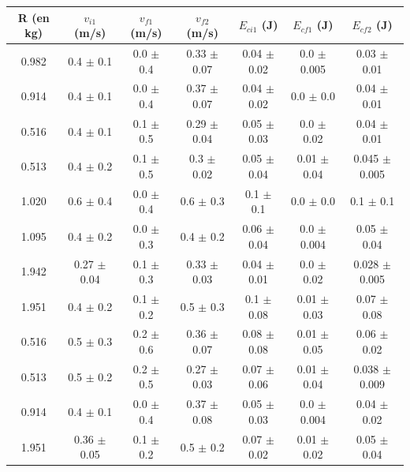 \documentclass[12pt]{article}
\begin{document}
\begin{table}[h!]
    \begin{center}
        \begin{tabular}{|c|c|c|c|c|c|c|}
            \hline
            R (en kg) & $v_{i1}$ (m/s) & $v_{f1}$ (m/s) & $v_{f2}$ (m/s) & $E_{ci1}$ (J) & $E_{cf1}$ (J) & $E_{cf2}$ (J) \\ \hline
            0.982 & 0.4 $\pm$ 0.1 & 0.0 $\pm$ 0.4 & 0.33 $\pm$ 0.07 & 0.04 $\pm$ 0.02 & 0.0 $\pm$ 0.005 & 0.03 $\pm$ 0.01 \\ 
            0.914 & 0.4 $\pm$ 0.1 & 0.0 $\pm$ 0.4 & 0.37 $\pm$ 0.07 & 0.04 $\pm$ 0.02 & 0.0 $\pm$ 0.0 & 0.04 $\pm$ 0.01 \\ 
            0.516 & 0.4 $\pm$ 0.1 & 0.1 $\pm$ 0.5 & 0.29 $\pm$ 0.04 & 0.05 $\pm$ 0.03 & 0.0 $\pm$ 0.02 & 0.04 $\pm$ 0.01 \\ 
            0.513 & 0.4 $\pm$ 0.2 & 0.1 $\pm$ 0.5 & 0.3 $\pm$ 0.02 & 0.05 $\pm$ 0.04 & 0.01 $\pm$ 0.04 & 0.045 $\pm$ 0.005 \\ 
            1.020 & 0.6 $\pm$ 0.4 & 0.0 $\pm$ 0.4 & 0.6 $\pm$ 0.3 & 0.1 $\pm$ 0.1 & 0.0 $\pm$ 0.0 & 0.1 $\pm$ 0.1 \\ 
            1.095 & 0.4 $\pm$ 0.2 & 0.0 $\pm$ 0.3 & 0.4 $\pm$ 0.2 & 0.06 $\pm$ 0.04 & 0.0 $\pm$ 0.004 & 0.05 $\pm$ 0.04 \\ 
            1.942 & 0.27 $\pm$ 0.04 & 0.1 $\pm$ 0.3 & 0.33 $\pm$ 0.03 & 0.04 $\pm$ 0.01 & 0.0 $\pm$ 0.02 & 0.028 $\pm$ 0.005 \\ 
            1.951 & 0.4 $\pm$ 0.2 & 0.1 $\pm$ 0.2 & 0.5 $\pm$ 0.3 & 0.1 $\pm$ 0.08 & 0.01 $\pm$ 0.03 & 0.07 $\pm$ 0.08 \\ 
            0.516 & 0.5 $\pm$ 0.3 & 0.2 $\pm$ 0.6 & 0.36 $\pm$ 0.07 & 0.08 $\pm$ 0.08 & 0.01 $\pm$ 0.05 & 0.06 $\pm$ 0.02 \\ 
            0.513 & 0.5 $\pm$ 0.2 & 0.2 $\pm$ 0.5 & 0.27 $\pm$ 0.03 & 0.07 $\pm$ 0.06 & 0.01 $\pm$ 0.04 & 0.038 $\pm$ 0.009 \\ 
            0.914 & 0.4 $\pm$ 0.1 & 0.0 $\pm$ 0.4 & 0.37 $\pm$ 0.08 & 0.05 $\pm$ 0.03 & 0.0 $\pm$ 0.004 & 0.04 $\pm$ 0.02 \\ 
            1.951 & 0.36 $\pm$ 0.05 & 0.1 $\pm$ 0.2 & 0.5 $\pm$ 0.2 & 0.07 $\pm$ 0.02 & 0.01 $\pm$ 0.02 & 0.05 $\pm$ 0.04 \\ 
            \hline
        \end{tabular}
    \end{center}
\end{table}
\end{document}
